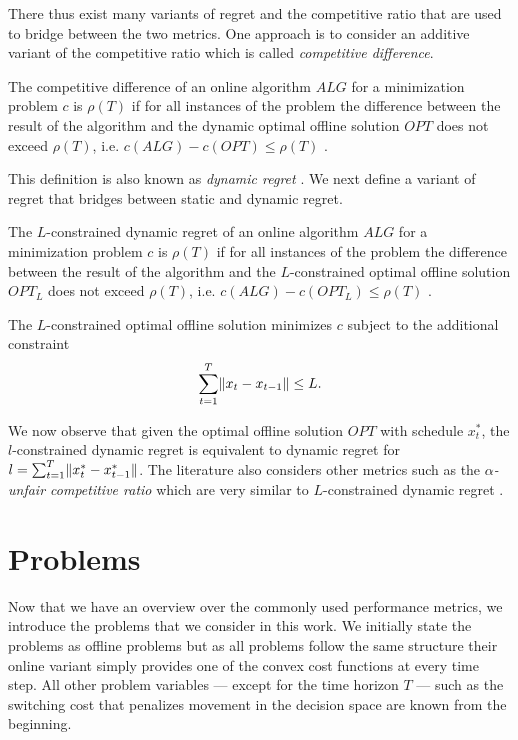 There thus exist many variants of regret and the competitive ratio that are used to bridge between the two metrics. One approach is to consider an additive variant of the competitive ratio which is called \textit{competitive difference}.

\begin{definition}
The competitive difference of an online algorithm $ALG$ for a minimization problem $c$ is $\rho(T)$ if for all instances of the problem the difference between the result of the algorithm and the dynamic optimal offline solution $OPT$ does not exceed $\rho(T)$, i.e. $c(ALG) - c(OPT) \leq \rho(T)$ \cite{Chen2015}.
\end{definition}

This definition is also known as \textit{dynamic regret} \cite{Chen2018}. We next define a variant of regret that bridges between static and dynamic regret.

\begin{definition}
The $L$-constrained dynamic regret of an online algorithm $ALG$ for a minimization problem $c$ is $\rho(T)$ if for all instances of the problem the difference between the result of the algorithm and the $L$-constrained optimal offline solution $OPT_L$ does not exceed $\rho(T)$, i.e. $c(ALG) - c(OPT_L) \leq \rho(T)$ \cite{Chen2018}.

The $L$-constrained optimal offline solution minimizes $c$ subject to the additional constraint \begin{align*}
    \sum_{t=1}^T \lVert x_t - x_{t-1}\rVert \leq L.
\end{align*}
\end{definition}

We now observe that given the optimal offline solution $OPT$ with schedule $x_t^*$, the $l$-constrained dynamic regret is equivalent to dynamic regret for $l = \sum_{t=1}^T \lVert x_t^* - x_{t-1}^*\rVert$. The literature also considers other metrics such as the \textit{$\alpha$-unfair competitive ratio} which are very similar to $L$-constrained dynamic regret \cite{Andrew2015}.

\section{Problems}

Now that we have an overview over the commonly used performance metrics, we introduce the problems that we consider in this work. We initially state the problems as offline problems but as all problems follow the same structure their online variant simply provides one of the convex cost functions at every time step. All other problem variables --- except for the time horizon $T$ --- such as the switching cost that penalizes movement in the decision space are known from the beginning.

